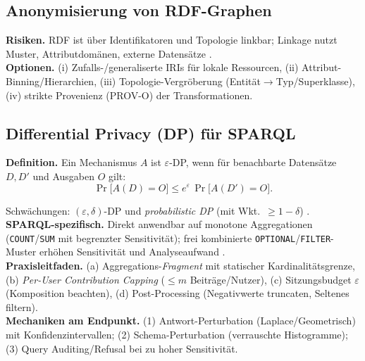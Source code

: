 \subsection{Anonymisierung von RDF-Graphen}
\textbf{Risiken.} RDF ist über Identifikatoren und Topologie linkbar; Linkage nutzt Muster, Attributdomänen, externe Datensätze \cite{delanaux-linkage,logical-foundations-lda}. \\
\textbf{Optionen.} (i) Zufalls-/generaliserte IRIs für lokale Ressourcen, (ii) Attribut-Binning/Hierarchien, (iii) Topologie-Vergröberung (Entität$\rightarrow$Typ/Superklasse), (iv) strikte Provenienz (PROV-O) der Transformationen.

\subsection{Differential Privacy (DP) für SPARQL}
\textbf{Definition.} Ein Mechanismus $A$ ist $\varepsilon$-DP, wenn für benachbarte Datensätze $D,D'$ und Ausgaben $O$ gilt:
\[
  \Pr\!\big[A(D)=O\big] \le e^{\varepsilon}\,\Pr\!\big[A(D')=O\big].
\]

Schwächungen: $(\varepsilon,\delta)$-DP und \emph{probabilistic DP} (mit Wkt.\ $\ge1-\delta$) \cite{GoetzZealous}. \\
\textbf{SPARQL-spezifisch.} Direkt anwendbar auf monotone Aggregationen (\texttt{COUNT}/\texttt{SUM} mit begrenzter Sensitivität); frei kombinierte \texttt{OPTIONAL}/\texttt{FILTER}-Muster erhöhen Sensitivität und Analyseaufwand \cite{builaranda-dp-sparql}. \\
\textbf{Praxisleitfaden.} (a) Aggregations-\emph{Fragment} mit statischer Kardinalitätsgrenze, (b) \emph{Per-User Contribution Capping} ($\le m$ Beiträge/Nutzer), (c) Sitzungsbudget $\varepsilon$ (Komposition beachten), (d) Post-Processing (Negativwerte truncaten, Seltenes filtern). \\
\textbf{Mechaniken am Endpunkt.} (1) Antwort-Perturbation (Laplace/Geometrisch) mit Konfidenzintervallen; (2) Schema-Perturbation (verrauschte Histogramme); (3) Query Auditing/Refusal bei zu hoher Sensitivität.

